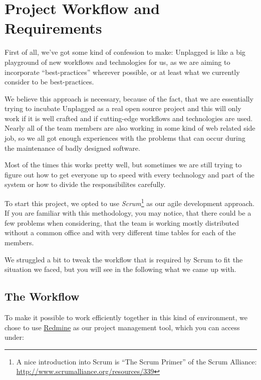 \chapter{Project Workflow and  Requirements}\label{chap:systemRequirements}

First of all, we've got some kind of confession to make: Unplagged is like a big playground of new 
workflows and technologies for us, as we are aiming to incorporate 
\enquote{best-practices} wherever possible, or at least what we currently consider to be best-practices. 

We believe this approach is necessary, because of the 
fact, that we are essentially trying to incubate Unplagged as a real open source project and this will 
only work if
it is well crafted and if cutting-edge workflows and technologies are used. Nearly all of the team members
are also working in some kind of web related side job, so we all got enough experiences with the problems that can 
occur during the maintenance of badly designed software.

Most of the times this works pretty well, but sometimes we are still trying to figure out how to 
get everyone up to speed with every technology and part of the system or how to divide the responsibilites carefully.

To start this project, we opted to use \textit{Scrum}\footnote{A nice introduction into Scrum is \enquote{The Scrum Primer} 
of the Scrum Alliance: \url{http://www.scrumalliance.org/resources/339}} 
as our agile development approach. If you are familiar with this
methodology, you may notice, that there could be a few problems when considering, that the team is working mostly 
distributed
without a common office and with very different time tables for each of the members.

We struggled a bit to tweak the workflow that is required by Scrum to fit the situation we faced, but you will see in the
following what we came up with.

\section{The Workflow}

To make it possible to work efficiently together in this kind of environment, we chose to use
\href{http://www.redmine.org/}{Redmine} as our project management tool, which you can access under:

